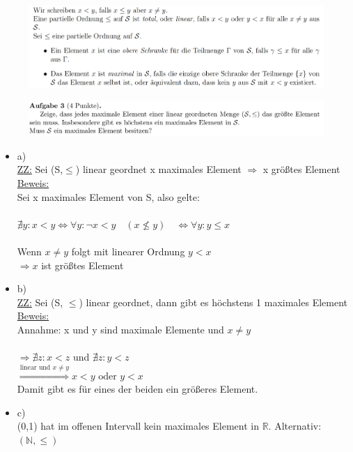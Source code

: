 \documentclass[a4paper]{scrartcl}
\begin{document}
    \begin{figure}[H]
        \centering
        \includegraphics[scale=0.3]{./total.png}
        \label{fig:./total}
    \end{figure}

    \begin{figure}[H]
        \centering
        \includegraphics[scale=0.3]{./A-3.png}
        \label{fig:}
    \end{figure}

    \begin{itemize}
        \item a)\\
            \underline{ZZ:} Sei (S,$\leq$) linear geordnet x maximales Element $\Rightarrow$ x größtes Element\\
            \underline{Beweis:}\\
                Sei x maximales Element von S, also gelte:\\
                \\$\nexists y: x < y \Leftrightarrow \forall y: \neg x < y \quad (x \nleq y) \quad \Leftrightarrow \forall y: y \leq x$\\
                \\Wenn  $x \neq y$ folgt mit linearer Ordnung $y < x$\\
                $\Rightarrow x$ ist größtes Element\\

        \item b)\\
            \underline{ZZ:} Sei (S, $\leq$) linear geordnet, dann gibt es höchstens 1 maximales Element\\
            \underline{Beweis:}\\
                Annahme: x und y sind maximale Elemente und $x \neq y$\\
                \\$\Rightarrow \nexists z: x < z$ und $\nexists z: y < z$\\
                $\overset{\text{linear und } x \neq y}{\Rightarrow} x < y \text{ oder } y < x$\\
                Damit gibt es für eines der beiden ein größeres Element.\\

        \item c)\\
            (0,1) hat im offenen Intervall kein maximales Element in $\mathds{R}$. Alternativ: $(\mathds{N}, \leq)$\\
    \end{itemize}
\end{document}
